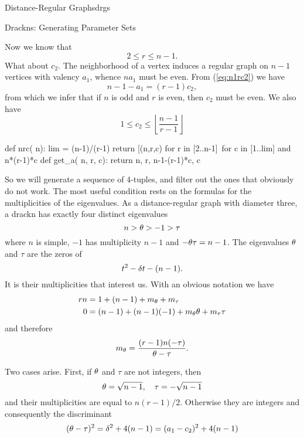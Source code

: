 \begin{chap}{Distance-Regular Graphs}{drgs}
\begin{sect}{Drackns: Generating Parameter Sets}
\begin{para}
Now we know that
\begin{equation}
\label{eq:rbnd}
    2\le r\le n-1.
\end{equation}
What about $c_2$. The neighborhood of a vertex induces a regular graph
on $n-1$ vertices with valency $a_1$, whence $na_1$ must be even.
From (\ref{eq:n1rc2}) we have 
\[
    n-1-a_1 = (r-1)c_2,
\]
from which we infer that if $n$ is odd and $r$ is even, then $c_2$ must be
even. We also have
\begin{equation}
\label{c2bnd}
    1\le c_2 \le \left\lfloor\frac{n-1}{r-1}\right\rfloor
\end{equation}
\end{para}
%
\begin{sagecode}
\begin{sageinput}
    def nrc( n):
        lim = (n-1)/(r-1)
        return [(n,r,c) for r in [2..n-1]\ 
         for c in [1..lim] and n*(r-1)*c %
    def get_a( n, r, c):
        return n, r, n-1-(r-1)*c, c
\end{sageinput}
\end{sagecode}
%
\begin{para}
So we will generate a sequence of 4-tuples, and filter out the ones
that obviously do not work. The most useful condition rests on the formulas
for the multiplicities of the eigenvalues. As a distance-regular graph
with diameter three, a drackn has exactly four distinct eigenvalues
\[
    n > \theta > -1 > \tau
\]
where $n$ is simple, $-1$ has multiplicity $n-1$ and $-\theta\tau=n-1$.
The eigenvalues $\theta$ and $\tau$ are the zeros of
\[
    t^2 -\delta t - (n-1).
\]
It is their multiplicities that interest us. With an obvious notation we have
\begin{align*}
    rn &= 1 + (n-1) +m_\theta+m_\tau\\
    0  &= (n-1) +(n-1)(-1) +m_\theta\theta+m_\tau\tau
\end{align*}
and therefore
\begin{equation}
\label{eq:mult}
    m_\theta = \frac{(r-1)n(-\tau)}{\theta -\tau}.
\end{equation}
\end{para}
%
\begin{para}
Two cases arise. First, if $\theta$ and $\tau$ are not integers, then
\[
    \theta=\sqrt{n-1},\quad \tau=-\sqrt{n-1}
\]
and their multiplicities are equal to $n(r-1)/2$. Otherwise they are integers
and consequently the discriminant
\begin{equation}
\label{eq:discr}
    (\theta-\tau)^2 = \delta^2+4(n-1) = (a_1-c_2)^2+4(n-1)
\end{equation}

\end{para}
\end{sect}
\end{chap}
